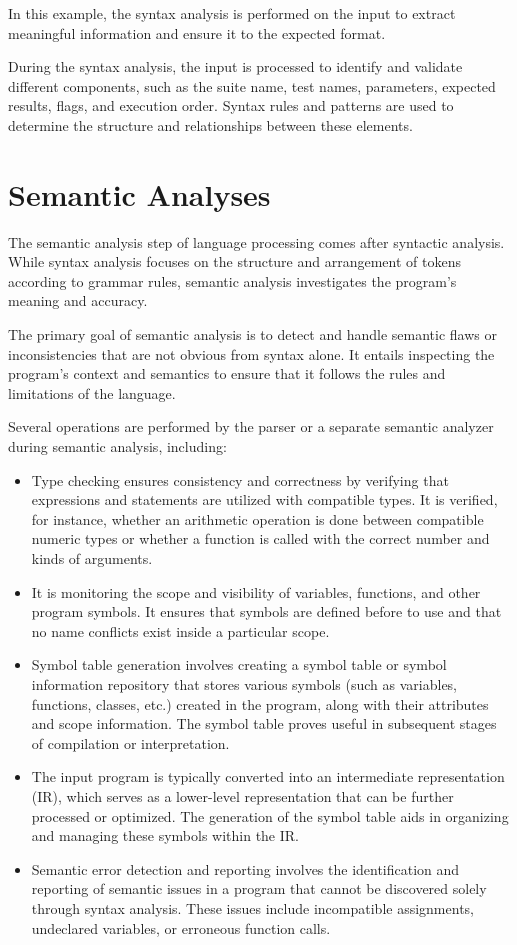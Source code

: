 In this example, the syntax analysis is performed on the input to extract meaningful information and ensure it to the expected format.

During the syntax analysis, the input is processed to identify and validate different components, such as the suite name, test names, parameters, expected results, flags, and execution order. Syntax rules and patterns are used to determine the structure and relationships between these elements.



\section{Semantic Analyses}
The semantic analysis step of language processing comes after syntactic analysis. While syntax analysis focuses on the structure and arrangement of tokens according to grammar rules, semantic analysis investigates the program's meaning and accuracy.

The primary goal of semantic analysis is to detect and handle semantic flaws or inconsistencies that are not obvious from syntax alone. It entails inspecting the program's context and semantics to ensure that it follows the rules and limitations of the language.

Several operations are performed by the parser or a separate semantic analyzer during semantic analysis, including:

\begin{itemize}
    \item Type checking ensures consistency and correctness by verifying that expressions and statements are utilized with compatible types. It is verified, for instance, whether an arithmetic operation is done between compatible numeric types or whether a function is called with the correct number and kinds of arguments.
    \item It is monitoring the scope and visibility of variables, functions, and other program symbols. It ensures that symbols are defined before to use and that no name conflicts exist inside a particular scope.
    \item Symbol table generation involves creating a symbol table or symbol information repository that stores various symbols (such as variables, functions, classes, etc.) created in the program, along with their attributes and scope information. The symbol table proves useful in subsequent stages of compilation or interpretation.

    \item The input program is typically converted into an intermediate representation (IR), which serves as a lower-level representation that can be further processed or optimized. The generation of the symbol table aids in organizing and managing these symbols within the IR.
    \item Semantic error detection and reporting involves the identification and reporting of semantic issues in a program that cannot be discovered solely through syntax analysis. These issues include incompatible assignments, undeclared variables, or erroneous function calls.
\end{itemize}

